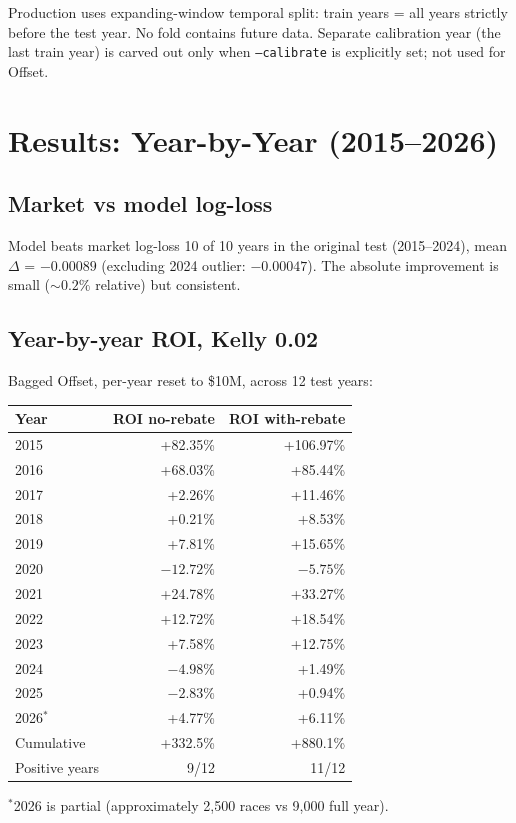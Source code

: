 \documentclass[11pt]{article}
\begin{document}
Production uses expanding-window temporal split: train years = all
years strictly before the test year. No fold contains future data.
Separate calibration year (the last train year) is carved out only
when \texttt{--calibrate} is explicitly set; not used for Offset.

\section{Results: Year-by-Year (2015--2026)}

\subsection{Market vs model log-loss}

Model beats market log-loss 10 of 10 years in the original test
(2015--2024), mean $\Delta$ = $-0.00089$ (excluding 2024 outlier: $-0.00047$).
The absolute improvement is small ($\sim 0.2\%$ relative) but consistent.

\subsection{Year-by-year ROI, Kelly 0.02}

Bagged Offset, per-year reset to \$10M, across 12 test years:

\begin{center}
\begin{tabular}{lrr}
\toprule
Year & ROI no-rebate & ROI with-rebate \\
\midrule
2015 & +82.35\% & +106.97\% \\
2016 & +68.03\% & +85.44\% \\
2017 & +2.26\% & +11.46\% \\
2018 & +0.21\% & +8.53\% \\
2019 & +7.81\% & +15.65\% \\
2020 & $-12.72\%$ & $-5.75\%$ \\
2021 & +24.78\% & +33.27\% \\
2022 & +12.72\% & +18.54\% \\
2023 & +7.58\% & +12.75\% \\
2024 & $-4.98\%$ & +1.49\% \\
2025 & $-2.83\%$ & +0.94\% \\
2026$^*$ & +4.77\% & +6.11\% \\
\midrule
Cumulative & +332.5\% & +880.1\% \\
Positive years & 9/12 & 11/12 \\
\bottomrule
\end{tabular}
\end{center}
$^*$2026 is partial (approximately 2{,}500 races vs 9{,}000 full year).
\end{document}
